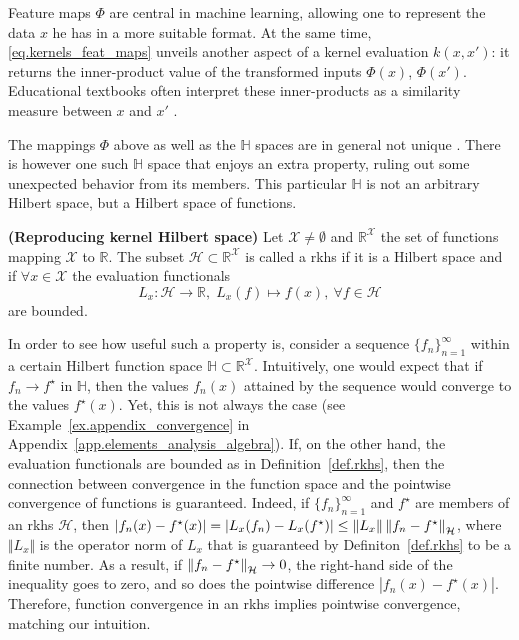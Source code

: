Feature maps $\Phi$ are central in machine learning, allowing one to represent the data $x$ he has in a more suitable format. At the same time, \eqref{eq.kernels_feat_maps} unveils another aspect of a kernel evaluation $k(x,x')$: it returns the inner-product value of the transformed inputs $\Phi(x)$, $\Phi(x')$. Educational textbooks often interpret these inner-products as a similarity measure between $x$ and $x'$ \citep{scholkopf2002learning}.

The mappings $\Phi$ above as well as the $\mathbb{H}$ spaces are in general not unique \citep[§4]{steinwart2008svm_book}. There is however one such $\mathbb{H}$ space that enjoys an extra property, ruling out some unexpected behavior from its members. This particular $\mathbb{H}$ is not an arbitrary Hilbert space, but a Hilbert space of functions.

\begin{definition}
	\label{def.rkhs}
	\textbf{(Reproducing kernel Hilbert space)} 
	Let $\mathcal{X} \neq \emptyset$ and $\mathbb{R}^\mathcal{X}$ the set of functions mapping $\mathcal{X}$ to $\mathbb{R}$. The subset $\mathcal{H} \subset \mathbb{R}^\mathcal{X}$ is called a \ac{rkhs} if it is a Hilbert space and if $\forall x \in \mathcal{X}$ the evaluation functionals
	\begin{equation}
		L_x: \mathcal{H} \rightarrow \mathbb{R}, \; L_x(f) \mapsto f(x), \ \forall f\in \mathcal{H}
	\end{equation}
	are bounded.
\end{definition}

In order to see how useful such a property is, consider a sequence $\{f_n\}_{n=1}^\infty$ within a certain Hilbert function space $\mathbb{H} \subset \mathbb{R}^\mathcal{X}$. Intuitively, one would expect that if $f_n \rightarrow f^\star$ in $\mathbb{H}$, then the values $f_n(x)$ attained by the sequence would converge to the values $f^\star(x)$. Yet, this is not always the case (see Example~\ref{ex.appendix_convergence} in Appendix~\ref{app.elements_analysis_algebra}). If, on the other hand, the evaluation functionals are bounded as in Definition~\ref{def.rkhs}, then the connection between convergence in the function space and the pointwise convergence of functions is guaranteed. Indeed, if $\{f_n\}_{n=1}^\infty$ and $f^\star$ are members of an \ac{rkhs} $\mathcal{H}$, then $|f_n(x)-f^\star(x)| = | L_x(f_n) - L_x(f^\star)|  \leq \Vert L_x \Vert \left\| f_n - f^\star \right\|_\mathcal{H}$, where $\Vert L_x \Vert $ is the operator norm of $L_x$ that is guaranteed by Definiton~\ref{def.rkhs} to be a finite number. As a result, if $\left\| f_n - f^\star \right\|_\mathcal{H} \rightarrow 0$, the right-hand side of the inequality goes to zero, and so does the pointwise difference $|f_n(x)-f^\star(x)|$. Therefore, function convergence in an \ac{rkhs} implies pointwise convergence, matching our intuition.

